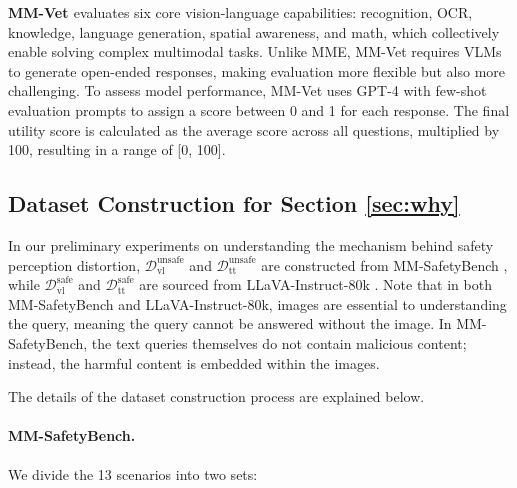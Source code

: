 \textbf{MM-Vet \cite{DBLP:conf/icml/YuYLWL0WW24}} evaluates six core vision-language capabilities: recognition, OCR, knowledge, language generation, spatial awareness, and math, which collectively enable solving complex multimodal tasks. Unlike MME, MM-Vet requires VLMs to generate open-ended responses, making evaluation more flexible but also more challenging. To assess model performance, MM-Vet uses GPT-4 with few-shot evaluation prompts to assign a score between 0 and 1 for each response. The final utility score is calculated as the average score across all questions, multiplied by 100, resulting in a range of [0, 100].


\subsection{Dataset Construction for Section \ref{sec:why}}

In our preliminary experiments on understanding the mechanism behind safety perception distortion, $\mathcal{D}^\text{unsafe}_\text{vl}$ and $\mathcal{D}^\text{unsafe}_\text{tt}$ are constructed from MM-SafetyBench \cite{liu2025mm}, while $\mathcal{D}^\text{safe}_\text{vl}$ and $\mathcal{D}^\text{safe}_\text{tt}$ are sourced from LLaVA-Instruct-80k \cite{liu2024visual}. Note that in both MM-SafetyBench and LLaVA-Instruct-80k, images are essential to understanding the query, meaning the query cannot be answered without the image. In MM-SafetyBench, the text queries themselves do not contain malicious content; instead, the harmful content is embedded within the images.

The details of the dataset construction process are explained below.

\paragraph{MM-SafetyBench.} We divide the 13 scenarios into two sets:

